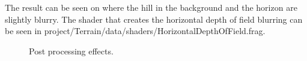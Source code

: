 The result can be seen on  where the hill in
the background and the horizon are slightly blurry. The shader that
creates the horizontal depth of field blurring can be seen in
project/Terrain/data/shaders/HorizontalDepthOfField.frag.

\begin{figure}
  \centering
  \caption{Post processing effects.}
  \label{fig:dofMotionBlur}
\end{figure}



